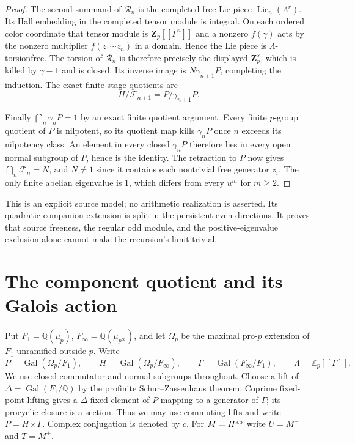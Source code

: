 \documentclass[11pt]{article}
\theoremstyle{definition}\newtheorem{definition}[theorem]{Definition}
\begin{document}
\begin{proof}
The second summand of $\mathcal R_n$ is the completed free
Lie piece $\operatorname{Lie}_n(\Lambda^r)$.
Its Hall embedding in the completed tensor module
is integral. On each ordered color coordinate that
tensor module is $\mathbf Z_p[[\Gamma^n]]$ and a
nonzero $f(\gamma)$ acts by the nonzero multiplier
$f(z_1\cdots z_n)$ in a domain. Hence the Lie piece
is $\Lambda$-torsionfree. The torsion of $\mathcal R_n$ is
therefore precisely the displayed $\mathbf Z_p^s$,
which is killed by $\gamma-1$ and is closed. Its
inverse image is $N\gamma_{n+1}P$, completing the
induction. The exact finite-stage quotients are
\[
                         H/\mathcal F_{n+1}=P/\gamma_{n+1}P.
\]

Finally $\bigcap_n\gamma_nP=1$ by an exact finite
quotient argument. Every finite $p$-group quotient
of $P$ is nilpotent, so its quotient map kills
$\gamma_nP$ once $n$ exceeds its nilpotency class.
An element in every closed $\gamma_nP$ therefore
lies in every open normal subgroup of $P$, hence is
the identity. The retraction to $P$ now gives
$\bigcap_n\mathcal F_n=N$, and $N\ne1$ since it contains
each nontrivial free generator $z_i$.
The only finite abelian eigenvalue is $1$, which
differs from every $u^m$ for $m\geq2$.
\end{proof}

This is an explicit source model; no arithmetic
realization is asserted. Its quadratic companion
extension is split in the persistent even directions.
It proves that source freeness, the regular odd
module, and the positive-eigenvalue exclusion alone
cannot make the recursion's limit trivial.


\section{The component quotient and its Galois action}
\label{sec:component-quotient-audit}

Put $F_1=\mathbb Q(\mu_p)$, $F_\infty=\mathbb Q(\mu_{p^\infty})$,
and let $\Omega_p$ be the maximal pro-$p$ extension of $F_1$
unramified outside $p$.  Write
\[
 P=\operatorname{Gal}(\Omega_p/F_1),\qquad
 H=\operatorname{Gal}(\Omega_p/F_\infty),\qquad
 \Gamma=\operatorname{Gal}(F_\infty/F_1),\qquad
 \Lambda=\mathbb Z_p[[\Gamma]].
\]
We use closed commutator and normal subgroups throughout.  Choose a
lift of $\Delta=\operatorname{Gal}(F_1/\mathbb Q)$ by the profinite
Schur--Zassenhaus theorem.  Coprime fixed-point lifting gives a
$\Delta$-fixed element of $P$ mapping to a generator of $\Gamma$;
its procyclic closure is a section.  Thus we may use commuting
lifts and write $P=H\rtimes\Gamma$.  Complex conjugation is denoted
by $c$.  For $M=H^{\rm ab}$ write $U=M^-$ and $T=M^+$.
\end{document}
